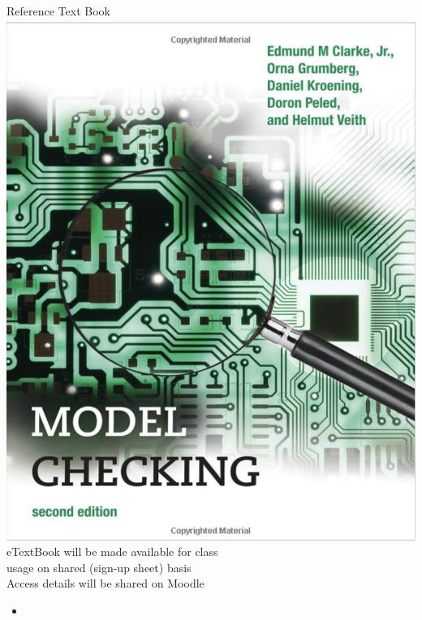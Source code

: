 \documentclass{beamer}
\begin{document}
\begin{frame}{Reference Text Book}
\includegraphics[scale=0.25]{pics/bookcover.png} \\
eTextBook will be made available for class \\
usage on shared (sign-up sheet) basis \\
Access details will be shared on Moodle

\end{frame}

\begin{frame}{}
\begin{itemize}
\item 
\end{itemize}

\end{frame}

\begin{frame}{}

\end{frame}

\begin{frame}{}

\end{frame}
\end{document}
